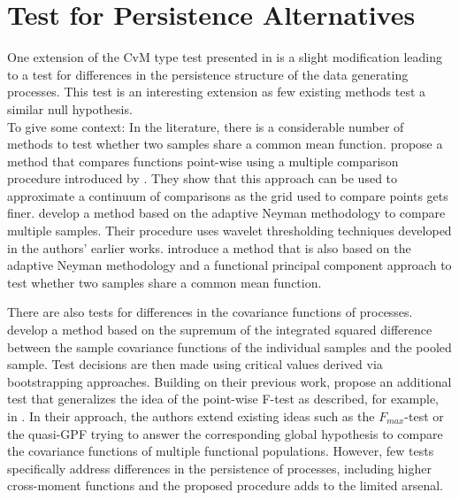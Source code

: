 \documentclass[12pt, a4paper]{article}
\theoremstyle{MAstyle} \newtheorem{assumption}{Assumption}[section]
\theoremstyle{MAstyle} \newtheorem{definition}{Definition}[section]
\theoremstyle{MAstyle} \newtheorem{theorem}{Theorem}[section]
\begin{document}
	\section{Test for Persistence Alternatives}\label{variant}
		One extension of the CvM type test presented in \cite{bugni_permutation_2021} is a slight modification leading to a test for differences in the persistence structure of the data generating processes. This test is an interesting extension as few existing methods test a similar null hypothesis.\\
		
		To give some context: In the literature, there is a considerable number of methods to test whether two samples share a common mean function.
		\cite{cox_pointwise_2008} propose a method that compares functions point-wise using a multiple comparison procedure introduced by \cite{westfall_resampling-based_1993}. They show that this approach can be used to approximate a continuum of comparisons as the grid used to compare points gets finer.
		\cite{fan_test_1998} develop a method based on the adaptive Neyman methodology to compare multiple samples. Their procedure uses wavelet thresholding techniques developed in the authors' earlier works. 
		\cite{lee_two_2015} introduce a method that is also based on the adaptive Neyman methodology and a functional principal component approach to test whether two samples share a common mean function.
		
		
		There are also tests for differences in the covariance functions of processes. 
		\cite{guo_testing_2018} develop a method based on the supremum of the integrated squared difference between the sample covariance functions of the individual samples and the pooled sample. Test decisions are then made using critical values derived via bootstrapping approaches.		Building on their previous work, \cite{guo_new_2019} propose an additional test that generalizes the idea of the point-wise F-test as described, for example, in \cite{ramsay_functional_2005}. In their approach, the authors extend existing ideas such as the $F_{\textit{max}}$-test or the quasi-GPF trying to answer the corresponding global hypothesis to compare the covariance functions of multiple functional populations.
		However, few tests specifically address differences in the persistence of processes, including higher cross-moment functions and the proposed procedure adds to the limited arsenal.
		
\end{document}
